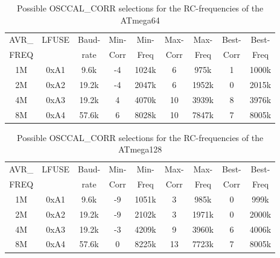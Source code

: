 \begin{table}[H]
  \begin{center}
    \begin{tabular}{| c | c | c || c | c || c | c || c | c |}
    \hline
             AVR\_ & LFUSE & Baud- & Min- & Min- & Max- & Max- & Best- & Best-  \\
             FREQ  &       & rate & Corr & Freq & Corr & Freq  & Corr  & Freq  \\
    \hline
    \hline
                1M & 0xA1  &  9.6k &  -4  & 1024k &  6  & 975k  & 1  & 1000k \\
    \hline
                2M & 0xA2  & 19.2k &  -4  & 2047k &  6  & 1952k & 0  & 2015k \\
    \hline
                4M & 0xA3  & 19.2k &   4  & 4070k & 10  & 3939k & 8  & 3976k \\
    \hline
                8M & 0xA4  & 57.6k &   6  & 8028k & 10  & 7847k & 7  & 8005k \\
    \hline
    \end{tabular}
  \end{center}
  \caption{Possible OSCCAL\_CORR selections for the RC-frequencies of the ATmega64}
  \label{tab:mega64freq}
\end{table}

\begin{table}[H]
  \begin{center}
    \begin{tabular}{| c | c | c || c | c || c | c || c | c |}
    \hline
             AVR\_ & LFUSE & Baud- & Min- & Min- & Max- & Max- & Best- & Best-  \\
             FREQ  &       & rate & Corr & Freq & Corr & Freq  & Corr  & Freq  \\
    \hline
    \hline
                1M & 0xA1  &  9.6k &  -9  & 1051k &  3  & 985k  & 0  &  999k \\
    \hline
                2M & 0xA2  & 19.2k &  -9  & 2102k &  3  & 1971k & 0  & 2000k \\
    \hline
                4M & 0xA3  & 19.2k &  -3  & 4209k &  9  & 3960k & 6  & 4006k \\
    \hline
                8M & 0xA4  & 57.6k &   0  & 8225k & 13  & 7723k & 7  & 8005k \\
    \hline
    \end{tabular}
  \end{center}
  \caption{Possible OSCCAL\_CORR selections for the RC-frequencies of the ATmega128}
  \label{tab:mega128freq}
\end{table}

